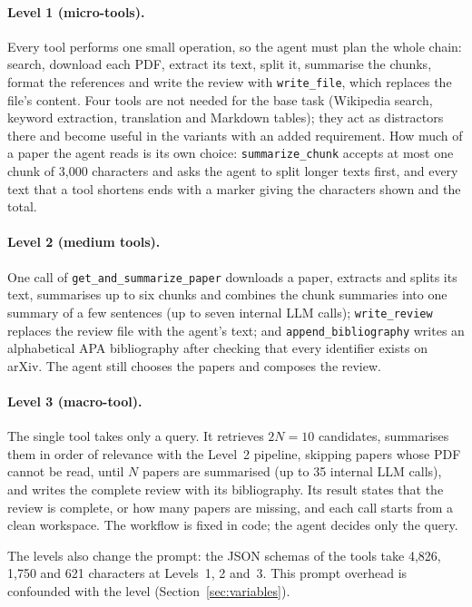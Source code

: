 \paragraph{Level 1 (micro-tools).} Every tool performs one small operation, so the agent must plan the whole chain: search, download each PDF, extract its text, split it, summarise the chunks, format the references and write the review with \texttt{write\_file}, which replaces the file's content. Four tools are not needed for the base task (Wikipedia search, keyword extraction, translation and Markdown tables); they act as distractors there and become useful in the variants with an added requirement. How much of a paper the agent reads is its own choice: \texttt{summarize\_chunk} accepts at most one chunk of 3{,}000 characters and asks the agent to split longer texts first, and every text that a tool shortens ends with a marker giving the characters shown and the total.

\paragraph{Level 2 (medium tools).} One call of \texttt{get\_and\_summarize\_paper} downloads a paper, extracts and splits its text, summarises up to six chunks and combines the chunk summaries into one summary of a few sentences (up to seven internal LLM calls); \texttt{write\_review} replaces the review file with the agent's text; and \texttt{append\_bibliography} writes an alphabetical APA bibliography after checking that every identifier exists on arXiv. The agent still chooses the papers and composes the review.

\paragraph{Level 3 (macro-tool).} The single tool takes only a query. It retrieves $2N=10$ candidates, summarises them in order of relevance with the Level~2 pipeline, skipping papers whose PDF cannot be read, until $N$ papers are summarised (up to 35 internal LLM calls), and writes the complete review with its bibliography. Its result states that the review is complete, or how many papers are missing, and each call starts from a clean workspace. The workflow is fixed in code; the agent decides only the query.

The levels also change the prompt: the JSON schemas of the tools take 4{,}826, 1{,}750 and 621 characters at Levels~1, 2 and~3. This prompt overhead is confounded with the level (Section~\ref{sec:variables}).

